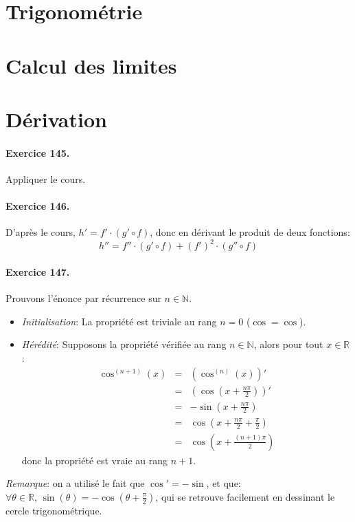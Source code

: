 \documentclass[a4paper,11pt]{article}
\begin{document}
\section{Trigonométrie}
\section{Calcul des limites}
\section{Dérivation}
\paragraph{Exercice 145.} Appliquer le cours.

\paragraph{Exercice 146.} D’après le cours, $h'=f' \cdot (g' \circ f)$, donc en dérivant le produit de deux fonctions:
\[
h''=f''\cdot (g' \circ f) + (f')^2 \cdot (g'' \circ f) 
\]

\paragraph{Exercice 147.} Prouvons l’énonce par récurrence sur $n\in\mathbb{N}$.
\begin{itemize} 
\item \textit{Initialisation}: La propriété est triviale au rang $n=0$ ($\cos=\cos$).\\
\item \textit{Hérédité}: Supposons la propriété vérifiée au rang $n\in\mathbb{N}$, alors pour tout $ x \in \mathbb{R}$:
\begin{eqnarray}
 \cos^{(n+1)}(x) &=& \left(\cos^{(n)}(x)\right)' \nonumber \\
  &=&  \left(\cos \left( x+\frac{n\pi}{2} \right) \right)' \nonumber \\
  &=&  -\sin \left( x+\frac{n\pi}{2} \right) \nonumber \\
  &=&  \cos \left( x+\frac{n\pi}{2} +\frac{\pi}{2}\right) \nonumber \\
  &=&  \cos \left( x+\frac{(n+1)\pi}{2}\right) \nonumber 
\end{eqnarray}
donc la propriété est vraie au rang $n+1$.
\end{itemize}
\textit{Remarque}: on a utilisé le fait que $\cos'=-\sin$, et que: $\forall \theta\in\mathbb{R}, \, \sin(\theta)=-\cos \left(\theta+\frac{\pi}{2}\right)$, qui se retrouve facilement en dessinant le cercle trigonométrique.
\end{document}

